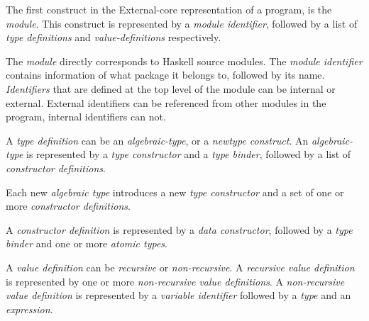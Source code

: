 

The first construct in the External-core representation of a program, is the \emph{module}. 
This construct is represented by a \emph{module identifier}, followed by a list of 
\emph{type definitions} and \emph{value-definitions} respectively.

The \emph{module} directly corresponds to Haskell source modules. The \emph{module identifier}
contains information of what package it belongs to, followed by its name. \emph{Identifiers} 
that are defined at the top level of the module can be internal or external. External identifiers
can be referenced from other modules in the program, internal identifiers can not.


A \emph{type definition} can be an \emph{algebraic-type}, or a \emph{newtype construct}. 
An \emph{algebraic-type} is represented by a \emph{type constructor} and a \emph{type binder}, 
followed by a list of \emph{constructor definitions}.

Each new \emph{algebraic type} introduces a new \emph{type constructor} and a set of one or
more \emph{constructor definitions}. 




A \emph{constructor definition} is represented by a \emph{data constructor}, followed by a 
\emph{type binder} and one or more \emph{atomic types}.


A \emph{value definition} can be \emph{recursive} or \emph{non-recursive}. A 
\emph{recursive value definition} is represented by one or more 
\emph{non-recursive value definitions}. A \emph{non-recursive value definition} is represented
by a \emph{variable identifier} followed by a \emph{type} and an \emph{expression}.

